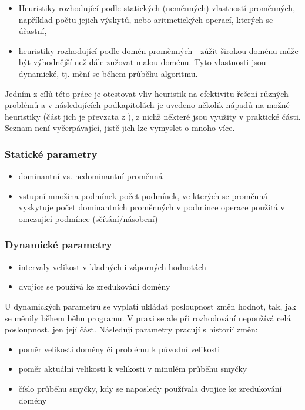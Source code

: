 \begin{itemize}
  \item Heuristiky rozhodující podle statických (neměnných) vlastností proměnných, například počtu jejich výskytů, nebo aritmetických operací, kterých se účastní,
  \item heuristiky rozhodující podle domén proměnných - zúžit širokou doménu může být výhodnější než dále zužovat malou doménu. Tyto vlastnosti jsou dynamické, tj. mění se během průběhu algoritmu.
\end{itemize}


Jedním z cílů této práce je otestovat vliv heuristik na efektivitu řešení různých problémů a v následujících podkapitolách je uvedeno několik nápadů na možné heuristiky (část jich je převzata z \cite{feiten10}), z nichž některé jsou využity v praktické části. Seznam není vyčerpávající, jistě jich lze vymyslet o mnoho více.

\subsubsection{Statické parametry}

\begin{itemize}
  \item dominantní vs. nedominantní proměnná
  \item vstupní množina podmínek
        \subitem počet podmínek, ve kterých se proměnná vyskytuje
        \subitem počet dominantních proměnných v podmínce
        \subitem operace použitá v omezující podmínce (sčítání/násobení)
\end{itemize}

\subsubsection{Dynamické parametry}

\begin{itemize}
    \item intervaly
        \subitem velikost
        \subitem v kladných i záporných hodnotách
    \item dvojice se používá ke zredukování domény
\end{itemize}

U dynamických parametrů se vyplatí ukládat posloupnost změn hodnot, tak, jak se měnily během běhu programu. V praxi se ale při rozhodování nepoužívá celá posloupnost, jen její část. Následují parametry pracují s historií změn:

\begin{itemize}
  \item poměr velikosti domény či problému k původní velikosti
  \item poměr aktuální velikosti k velikosti v minulém průběhu smyčky
  \item číslo průběhu smyčky, kdy se naposledy používala dvojice ke zredukování domény
\end{itemize}

